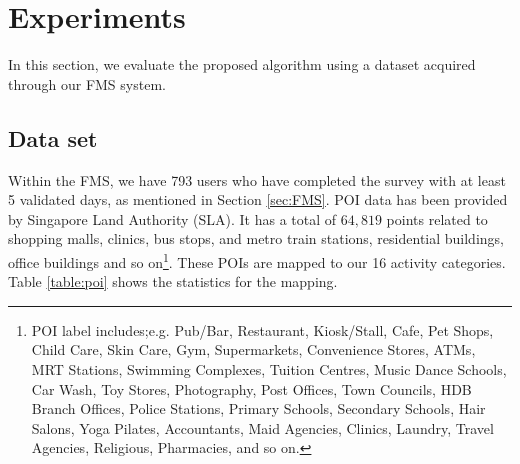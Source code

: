 \documentclass{sig-alternate}
\begin{document}
\section{Experiments}
In this section, we evaluate the proposed algorithm using a dataset acquired through our FMS system.


\subsection{Data set}
Within the FMS, we have 793 users who have completed the survey with at least 5 validated days, as mentioned in Section \ref{sec:FMS}. POI data has been provided by Singapore Land Authority (SLA). It has a total of $64,819$ points related to shopping malls, clinics, bus stops, and metro train stations, residential buildings, office buildings and so on\footnote{\scriptsize{POI label includes;e.g. Pub/Bar, Restaurant, Kiosk/Stall, Cafe, Pet Shops, Child Care, Skin Care, Gym, Supermarkets, Convenience Stores, ATMs, MRT Stations, Swimming Complexes, Tuition Centres, Music Dance Schools, Car Wash, Toy Stores, Photography, Post Offices, Town Councils, HDB Branch Offices, Police Stations, Primary Schools, Secondary Schools, Hair Salons, Yoga Pilates, Accountants, Maid Agencies, Clinics, Laundry, Travel Agencies, Religious, Pharmacies, and so on.}}. These POIs are mapped to our 16 activity categories. Table \ref{table:poi} shows the statistics for the mapping.
\end{document}
